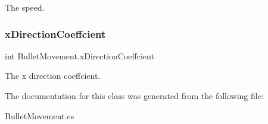 The speed. 

\mbox{\label{class_bullet_movement_a87f4f6ec7b16819ee058cfc9121660e0}} 
\subsubsection{\texorpdfstring{x\+Direction\+Coeffcient}{xDirectionCoeffcient}}
{\footnotesize\ttfamily int Bullet\+Movement.\+x\+Direction\+Coeffcient}



The x direction coeffcient. 



The documentation for this class was generated from the following file\+:\begin{DoxyCompactItemize}
\item 
Bullet\+Movement.\+cs\end{DoxyCompactItemize}

